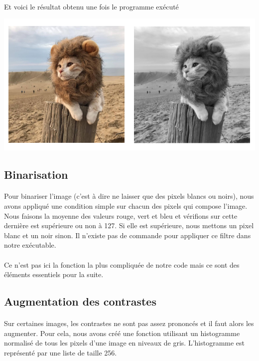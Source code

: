 \documentclass{article}
\begin{document}
\paragraph{}Et voici le résultat obtenu une fois le programme exécuté
\begin{center}
	\includegraphics[scale=0.45]{a}
\end{center}


\subsection{Binarisation}

\paragraph{}Pour binariser l'image (c'est à dire ne laisser que des pixels blancs ou noirs), nous avons appliqué une condition simple sur chacun des pixels qui compose l'image. Nous faisons la moyenne des valeurs rouge, vert et bleu et vérifions sur cette dernière est supérieure ou non à 127. Si elle est supérieure, nous mettons un pixel blanc et un noir sinon. Il n'existe pas de commande pour appliquer ce filtre dans notre exécutable.
\paragraph{} Ce n'est pas ici la fonction la plus compliquée de notre code mais ce sont des éléments essentiels pour la suite.

\newpage

\subsection{Augmentation des contrastes}

\paragraph{}Sur certaines images, les contrastes ne sont pas assez prononcés et il faut alors les augmenter. Pour cela, nous avons créé une fonction utilisant un histogramme normalisé de tous les pixels d'une image en niveaux de gris. L'histogramme est représenté par une liste de taille 256.
\end{document}
